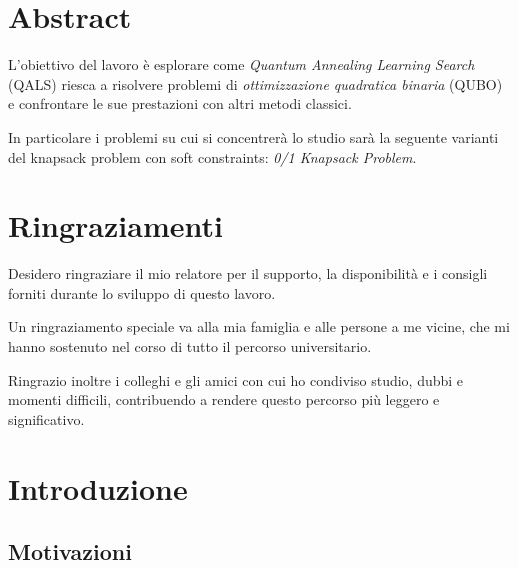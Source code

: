 \documentclass[12pt,a4paper,oneside]{report}
\begin{document}
\vspace*{\fill}
\clearpage

\chapter*{Abstract}

L'obiettivo del lavoro è esplorare come \emph{Quantum Annealing Learning Search} (QALS) riesca
a risolvere problemi di \emph{ottimizzazione quadratica binaria} (QUBO) e confrontare le sue prestazioni
con altri metodi classici.

In particolare i problemi su cui si concentrerà lo studio sarà la seguente varianti del knapsack problem con soft constraints:
\emph{{0/1} Knapsack Problem}.

\clearpage

\chapter*{Ringraziamenti}

Desidero ringraziare il mio relatore per il supporto, la disponibilit\`a e i consigli
forniti durante lo sviluppo di questo lavoro.

Un ringraziamento speciale va alla mia famiglia e alle persone a me vicine, che mi
hanno sostenuto nel corso di tutto il percorso universitario.

Ringrazio inoltre i colleghi e gli amici con cui ho condiviso studio, dubbi e momenti
difficili, contribuendo a rendere questo percorso pi\`u leggero e significativo.

\clearpage

\tableofcontents

\clearpage


\chapter{Introduzione}
\label{ch:introduzione}

\section{Motivazioni}
\label{sec:motivazioni}
\end{document}
